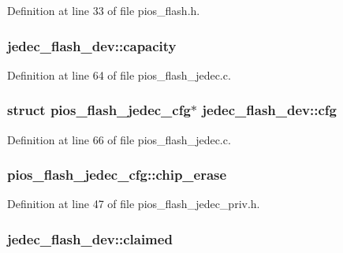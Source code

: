 Definition at line 33 of file pios\-\_\-flash.\-h.

\hypertarget{group___p_i_o_s___f_l_a_s_h_ga4253b6dd4128fd223d200bed60696804}{
\subsubsection[{capacity}]{ jedec\-\_\-flash\-\_\-dev\-::capacity}}\label{group___p_i_o_s___f_l_a_s_h_ga4253b6dd4128fd223d200bed60696804}


Definition at line 64 of file pios\-\_\-flash\-\_\-jedec.\-c.

\hypertarget{group___p_i_o_s___f_l_a_s_h_ga26db753e18e085086b539aca2438ee45}{
\subsubsection[{cfg}]{\setlength{\rightskip}{0pt plus 5cm}struct {\bf pios\-\_\-flash\-\_\-jedec\-\_\-cfg}$\ast$ jedec\-\_\-flash\-\_\-dev\-::cfg}}\label{group___p_i_o_s___f_l_a_s_h_ga26db753e18e085086b539aca2438ee45}


Definition at line 66 of file pios\-\_\-flash\-\_\-jedec.\-c.

\hypertarget{group___p_i_o_s___f_l_a_s_h_ga24dfbff52821d42480cde7686f07e956}{
\subsubsection[{chip\-\_\-erase}]{ pios\-\_\-flash\-\_\-jedec\-\_\-cfg\-::chip\-\_\-erase}}\label{group___p_i_o_s___f_l_a_s_h_ga24dfbff52821d42480cde7686f07e956}


Definition at line 47 of file pios\-\_\-flash\-\_\-jedec\-\_\-priv.\-h.

\hypertarget{group___p_i_o_s___f_l_a_s_h_ga0252ff9aa887c054e7299923b344bf59}{
\subsubsection[{claimed}]{ jedec\-\_\-flash\-\_\-dev\-::claimed}}\label{group___p_i_o_s___f_l_a_s_h_ga0252ff9aa887c054e7299923b344bf59}


